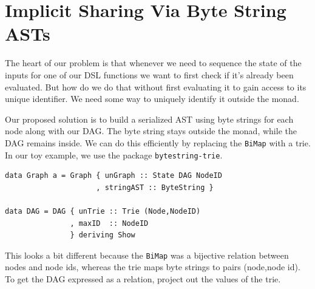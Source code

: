 \documentclass[runningheads]{llncs}
\begin{document}
\section{Implicit Sharing Via Byte String ASTs}

The heart of our problem is that whenever we need to sequence the state of the inputs
for one of our DSL functions we want to first check if it's already been
evaluated. But how do we do that without first evaluating it to gain access to
its unique identifier. We need some way to uniquely identify it outside the monad.

Our proposed solution is to build a serialized AST using byte strings for each node along with our
DAG.
The byte string stays outside the monad, while the DAG remains inside.
We can do this efficiently by replacing the \texttt{BiMap}
with a trie.
In our toy example, we use the package \texttt{bytestring-trie}.

\begin{verbatim}
data Graph a = Graph { unGraph :: State DAG NodeID
                     , stringAST :: ByteString }

data DAG = DAG { unTrie :: Trie (Node,NodeID)
               , maxID  :: NodeID
               } deriving Show
\end{verbatim}
This looks a bit different because the \texttt{BiMap}
was a bijective relation between nodes and node ids,
whereas the trie maps byte strings to pairs (node,node id).
To get the DAG expressed as a relation, project out the values of the trie.
\end{document}

